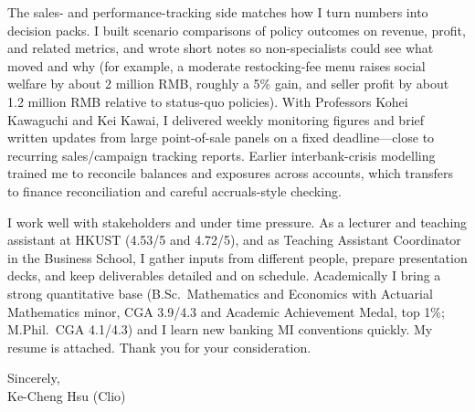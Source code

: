 \documentclass[11pt,letterpaper]{article}
\begin{document}
The sales- and performance-tracking side matches how I turn numbers into decision packs. I built scenario comparisons of policy outcomes on revenue, profit, and related metrics, and wrote short notes so non-specialists could see what moved and why (for example, a moderate restocking-fee menu raises social welfare by about 2 million RMB, roughly a 5\% gain, and seller profit by about 1.2 million RMB relative to status-quo policies). With Professors Kohei Kawaguchi and Kei Kawai, I delivered weekly monitoring figures and brief written updates from large point-of-sale panels on a fixed deadline---close to recurring sales/campaign tracking reports. Earlier interbank-crisis modelling trained me to reconcile balances and exposures across accounts, which transfers to finance reconciliation and careful accruals-style checking.

I work well with stakeholders and under time pressure. As a lecturer and teaching assistant at HKUST (4.53/5 and 4.72/5), and as Teaching Assistant Coordinator in the Business School, I gather inputs from different people, prepare presentation decks, and keep deliverables detailed and on schedule. Academically I bring a strong quantitative base (B.Sc.\ Mathematics and Economics with Actuarial Mathematics minor, CGA 3.9/4.3 and Academic Achievement Medal, top 1\%; M.Phil.\ CGA 4.1/4.3) and I learn new banking MI conventions quickly. My resume is attached. Thank you for your consideration.

\vspace{0.4em}
Sincerely,\\[0.35em]
Ke-Cheng Hsu (Clio)
\end{document}
